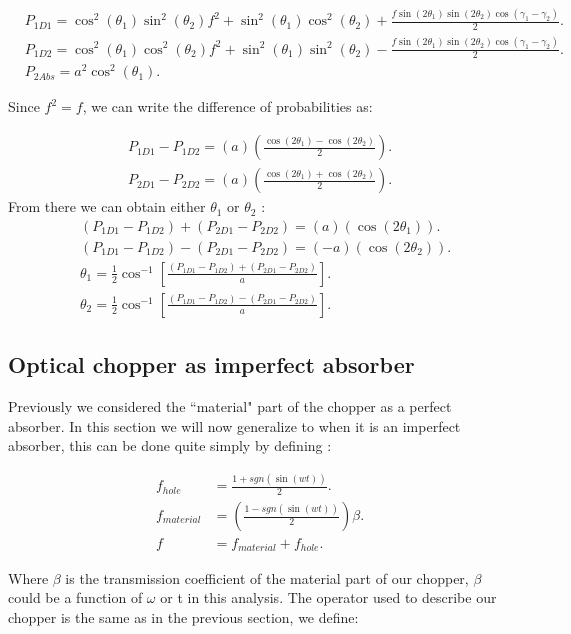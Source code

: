 \documentclass[12pt]{book}
\begin{document}
\begin{align}
& P_{1D1}=\cos^2(\theta_{1})\sin^2(\theta_{2})f^2+ \sin^2(\theta_{1})\cos^2(\theta_{2})+\frac{f \sin(2\theta_{1})\sin(2\theta_{2})\cos(\gamma_{1}-\gamma_{2})}{2}.\\
& P_{1D2}=\cos^2(\theta_{1})\cos^2(\theta_{2})f^2+ \sin^2(\theta_{1})\sin^2(\theta_{2})-\frac{f \sin(2\theta_{1})\sin(2\theta_{2})\cos(\gamma_{1}-\gamma_{2})}{2}.\\
& P_{2Abs}=a^2 \cos^2(\theta_{1}).
\end{align}

Since $f^2=f$, we can write the difference of probabilities as:

\begin{align}
P_{1D1}-P_{1D2}=(a)\left(\frac{\cos(2 \theta_{1})-\cos(2 \theta_{2})}{2}\right).\\
P_{2D1}-P_{2D2}=(a)\left(\frac{\cos(2 \theta_{1})+\cos(2 \theta_{2})}{2}\right).
\end{align}
 From there we can obtain either $\theta_{1}$  or $\theta_{2}$ :
\begin{align}
&(P_{1D1}-P_{1D2})+(P_{2D1}-P_{2D2})=(a)(\cos(2 \theta_{1})).\\
&(P_{1D1}-P_{1D2})-(P_{2D1}-P_{2D2})=(-a)(\cos(2 \theta_{2})).\\
 &\theta_{1}=\frac{1}{2}\cos^{-1}\left[\frac{(P_{1D1}-P_{1D2})+(P_{2D1}-P_{2D2})}{a}\right].\\
 &\theta_{2}=\frac{1}{2}\cos^{-1}\left[\frac{(P_{1D1}-P_{1D2})-(P_{2D1}-P_{2D2})}{a}\right].
 \end{align}
 
\pagebreak

\subsection{Optical chopper as imperfect absorber}

Previously we considered the ``material" part of the chopper as a perfect absorber. In this section we will now generalize to when it is an imperfect absorber, this can be done quite simply by defining :
 

\begin{align} 
f_{hole}&=\frac{1+sgn(\sin(wt))}{2}.\\
f_{material}&=\left(\frac{1-sgn(\sin(wt))}{2} \right)\beta.\\
f&=f_{material}+f_{hole}.
\end{align}


Where $\beta$ is the transmission coefficient of the material part of our chopper, $\beta$ could be a function of  $\omega$ or t in this analysis. The operator used to describe our chopper is the same as in the previous section, we define:
\end{document}
